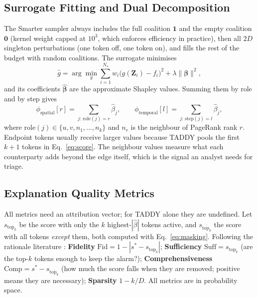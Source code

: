 \documentclass[conference]{IEEEtran}
\begin{document}
\subsection{Surrogate Fitting and Dual Decomposition}
The Smarter sampler always includes the full coalition $\mathbf{1}$ and the
empty coalition $\mathbf{0}$ (kernel weight capped at $10^3$, which enforces
efficiency in practice), then all $2D$ singleton perturbations (one token off,
one token on), and fills the rest of the budget with random coalitions. The
surrogate minimises
\begin{equation}
\hat{g}=\arg\min_{g}\sum_{i=1}^{N_s}w_i\bigl(g(\mathbf{Z}_i)-f_i\bigr)^2
+\lambda\|\boldsymbol{\beta}\|^2,
\label{eq:wls}
\end{equation}
and its coefficients $\hat{\boldsymbol{\beta}}$ are the approximate Shapley
values. Summing them by role and by step gives
\begin{equation}
\phi_{\mathrm{spatial}}[r]=\!\!\sum_{j:\,\mathrm{role}(j)=r}\!\!\hat{\beta}_j,
\qquad
\phi_{\mathrm{temporal}}[l]=\!\!\sum_{j:\,\mathrm{step}(j)=l}\!\!\hat{\beta}_j,
\label{eq:decomp}
\end{equation}
where $\mathrm{role}(j)\in\{u,v,n_1,\ldots,n_k\}$ and $n_r$ is the neighbour of
PageRank rank $r$. Endpoint tokens usually receive larger values because TADDY
pools the first $k{+}1$ tokens in Eq.~\eqref{eq:score}. The neighbour values
measure what each counterparty adds beyond the edge itself, which is the signal
an analyst needs for triage.

\subsection{Explanation Quality Metrics}
\label{subsec:metrics}
All metrics need an attribution vector; for TADDY alone they are undefined.
Let $s_{\mathrm{top}_k}$ be the score with only the $k$ highest-$|\hat\beta|$
tokens active, and $s_{\overline{\mathrm{top}_k}}$ the score with all tokens
\emph{except} them, both computed with Eq.~\eqref{eq:masking}. Following the
rationale literature \cite{deyoung2020eraser}:
\textbf{Fidelity} $\mathrm{Fid}=1-|s^*-s_{\mathrm{top}_k}|$;
\textbf{Sufficiency} $\mathrm{Suff}=s_{\mathrm{top}_k}$ (are the top-$k$ tokens
enough to keep the alarm?);
\textbf{Comprehensiveness} $\mathrm{Comp}=s^*-s_{\overline{\mathrm{top}_k}}$
(how much the score falls when they are removed; positive means they are
necessary); \textbf{Sparsity} $1-k/D$. All metrics are in probability space.

\end{document}

